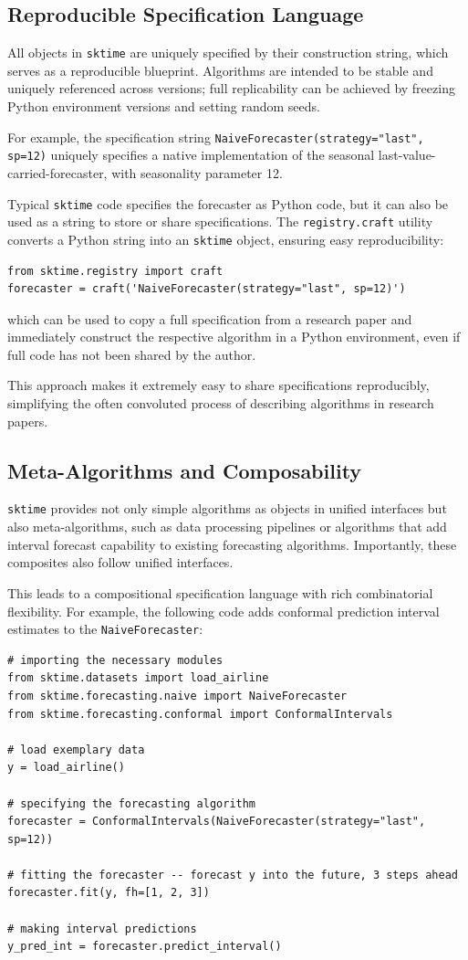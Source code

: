 \subsection{Reproducible Specification Language}
All objects in \texttt{sktime} are uniquely specified by their construction string, which serves as a reproducible blueprint. Algorithms are intended to be stable and uniquely referenced across versions; full replicability can be achieved by freezing Python environment versions and setting random seeds.

For example, the specification string 
\texttt{NaiveForecaster(strategy="last", sp=12)}
uniquely specifies a native implementation of the seasonal last-value-carried-forecaster, with seasonality parameter 12.

Typical \texttt{sktime} code specifies the forecaster as Python code, but it can also be used as a string to store or share specifications. The \texttt{registry.craft} utility converts a Python string into an \texttt{sktime} object, ensuring easy reproducibility:

\begin{verbatim}
from sktime.registry import craft
forecaster = craft('NaiveForecaster(strategy="last", sp=12)')
\end{verbatim}
which can be used to copy a full specification from a research paper and immediately construct the respective algorithm in a Python environment, even if full code has not been shared by the author.

This approach makes it extremely easy to share specifications reproducibly, simplifying the often convoluted process of describing algorithms in research papers.

\subsection{Meta-Algorithms and Composability}
\texttt{sktime} provides not only simple algorithms as objects in unified interfaces but also meta-algorithms, such as data processing pipelines or algorithms that add interval forecast capability to existing forecasting algorithms. Importantly, these composites also follow unified interfaces.

This leads to a compositional specification language with rich combinatorial flexibility. For example, the following code adds conformal prediction interval estimates to the \texttt{NaiveForecaster}:

\begin{verbatim}
# importing the necessary modules
from sktime.datasets import load_airline
from sktime.forecasting.naive import NaiveForecaster
from sktime.forecasting.conformal import ConformalIntervals

# load exemplary data
y = load_airline()

# specifying the forecasting algorithm
forecaster = ConformalIntervals(NaiveForecaster(strategy="last", sp=12))

# fitting the forecaster -- forecast y into the future, 3 steps ahead
forecaster.fit(y, fh=[1, 2, 3])

# making interval predictions
y_pred_int = forecaster.predict_interval()
\end{verbatim}

